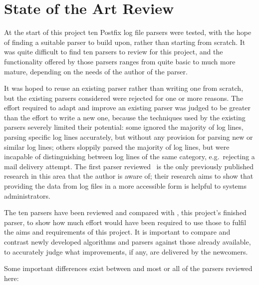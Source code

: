 \chapter{State of the Art Review}

\label{state of the art review}

At the start of this project ten Postfix log file parsers were tested, with
the hope of finding a suitable parser to build upon, rather than starting
from scratch.  It was quite difficult to find ten parsers to review for
this project, and the functionality offered by those parsers ranges from
quite basic to much more mature, depending on the needs of the author of
the parser.

It was hoped to reuse an existing parser rather than writing one from
scratch, but the existing parsers considered were rejected for one or more
reasons.  The effort required to adapt and improve an existing parser was
judged to be greater than the effort to write a new one, because the
techniques used by the existing parsers severely limited their potential:
some ignored the majority of log lines, parsing specific log lines
accurately, but without any provision for parsing new or similar log lines;
others sloppily parsed the majority of log lines, but were incapable of
distinguishing between log lines of the same category, e.g.\ rejecting a
mail delivery attempt.  The first parser reviewed~\cite{log-mail-analyser}
is the only previously published research in this area that the author is
aware of; their research aims to show that providing the data from log
files in a more accessible form is helpful to systems administrators.

The ten parsers have been reviewed and compared with \parsername{}, this
project's finished parser, to show how much effort would have been required
to use those to fulfil the aims and requirements of this project.  It is
important to compare and contrast newly developed algorithms and parsers
against those already available, to accurately judge what improvements, if
any, are delivered by the newcomers.

Some important differences exist between \parsername{} and most or all of
the parsers reviewed here:

